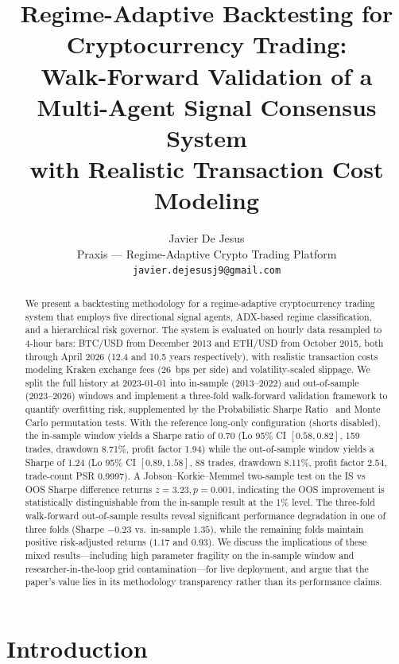\documentclass{article}
\title{Regime-Adaptive Backtesting for Cryptocurrency Trading:\\
Walk-Forward Validation of a Multi-Agent Signal Consensus System\\
with Realistic Transaction Cost Modeling}
\author{
  Javier De Jesus \\
  Praxis --- Regime-Adaptive Crypto Trading Platform\\
  \texttt{javier.dejesusj9@gmail.com}
}
\begin{document}
\maketitle

\begin{abstract}
We present a backtesting methodology for a regime-adaptive cryptocurrency trading system that employs five directional signal agents, ADX-based regime classification, and a hierarchical risk governor.
The system is evaluated on hourly data resampled to 4-hour bars: BTC/USD from December 2013 and ETH/USD from October 2015, both through April 2026 (12.4 and 10.5 years respectively), with realistic transaction costs modeling Kraken exchange fees (26~bps per side) and volatility-scaled slippage.
We split the full history at 2023-01-01 into in-sample (2013--2022) and out-of-sample (2023--2026) windows and implement a three-fold walk-forward validation framework to quantify overfitting risk, supplemented by the Probabilistic Sharpe Ratio~\citep{Bailey2014DSR} and Monte Carlo permutation tests.
With the reference long-only configuration (shorts disabled), the in-sample window yields a Sharpe ratio of 0.70 (Lo 95\% CI $[0.58, 0.82]$, 159 trades, drawdown 8.71\%, profit factor 1.94) while the out-of-sample window yields a Sharpe of 1.24 (Lo 95\% CI $[0.89, 1.58]$, 88 trades, drawdown 8.11\%, profit factor 2.54, trade-count PSR 0.9997).
A Jobson--Korkie--Memmel two-sample test on the IS vs OOS Sharpe difference returns $z = 3.23, p = 0.001$, indicating the OOS improvement is statistically distinguishable from the in-sample result at the 1\% level.
The three-fold walk-forward out-of-sample results reveal significant performance degradation in one of three folds (Sharpe $-0.23$ vs.\ in-sample $1.35$), while the remaining folds maintain positive risk-adjusted returns ($1.17$ and $0.93$).
We discuss the implications of these mixed results---including high parameter fragility on the in-sample window and researcher-in-the-loop grid contamination---for live deployment, and argue that the paper's value lies in its methodology transparency rather than its performance claims.
\end{abstract}

\section{Introduction}
\label{sec:intro}
\end{document}
